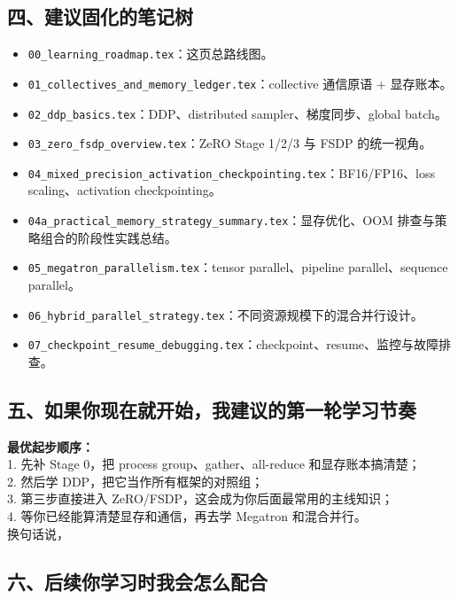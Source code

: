 \subsection{四、建议固化的笔记树}

\begin{itemize}[leftmargin=1.5em]
  \item \texttt{00\_learning\_roadmap.tex}：这页总路线图。
  \item \texttt{01\_collectives\_and\_memory\_ledger.tex}：collective 通信原语 + 显存账本。
  \item \texttt{02\_ddp\_basics.tex}：DDP、distributed sampler、梯度同步、global batch。
  \item \texttt{03\_zero\_fsdp\_overview.tex}：ZeRO Stage 1/2/3 与 FSDP 的统一视角。
  \item \texttt{04\_mixed\_precision\_activation\_checkpointing.tex}：BF16/FP16、loss scaling、activation checkpointing。
  \item \texttt{04a\_practical\_memory\_strategy\_summary.tex}：显存优化、OOM 排查与策略组合的阶段性实践总结。
  \item \texttt{05\_megatron\_parallelism.tex}：tensor parallel、pipeline parallel、sequence parallel。
  \item \texttt{06\_hybrid\_parallel\_strategy.tex}：不同资源规模下的混合并行设计。
  \item \texttt{07\_checkpoint\_resume\_debugging.tex}：checkpoint、resume、监控与故障排查。
\end{itemize}

\subsection{五、如果你现在就开始，我建议的第一轮学习节奏}

\begin{summarybox}
\textbf{最优起步顺序：}\\
1. 先补 Stage 0，把 process group、gather、all-reduce 和显存账本搞清楚；\\
2. 然后学 DDP，把它当作所有框架的对照组；\\
3. 第三步直接进入 ZeRO/FSDP，这会成为你后面最常用的主线知识；\\
4. 等你已经能算清楚显存和通信，再去学 Megatron 和混合并行。\\
换句话说，
\end{summarybox}

\subsection{六、后续你学习时我会怎么配合}

